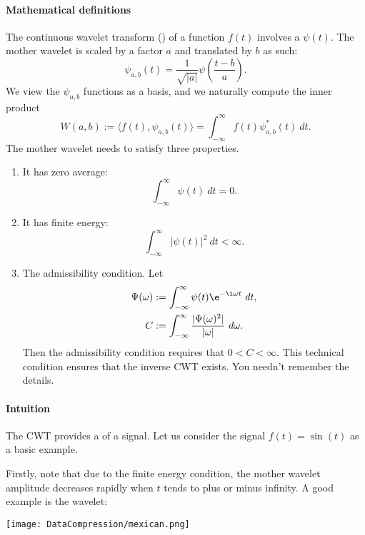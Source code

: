 \documentclass[a4paper, 11pt, openany]{book}
\begin{document}
\paragraph{Mathematical definitions}
The continuous wavelet transform () of a function $f(t)$ involves a  $\psi(t)$. The mother wavelet is scaled by a factor $a$ and translated by $b$ as such:
\[
    \psi_{a,b}(t) = \frac{1}{\sqrt{|a|}} \psi \left( \frac{t-b}{a} \right).
\]
We view the $\psi_{a,b}$ functions as a basis, and we naturally compute the inner product
\[
    W(a,b) := \langle f(t), \psi_{a,b}(t)  \rangle = \int_{-\infty}^\infty f(t) \psi^*_{a,b}(t) \ dt.
\]
The mother wavelet needs to satisfy three properties.
\begin{enumerate}
    \item It has zero average:
    \[
        \int_{-\infty}^\infty \psi(t) \ dt = 0.
    \]

    \item It has finite energy:
    \[
        \int_{-\infty}^\infty |\psi(t)|^2 \ dt < \infty.
    \]

    \item The admissibility condition. Let
    \begin{align*}
        \Psi(\omega) &:= \int_{-\infty}^\infty \psi(t) \e^{-\i \omega t} \ dt,\\
        C &:= \int_{-\infty}^\infty \frac{ |\Psi(\omega)^2| }{ |\omega| } \ d\omega.
    \end{align*}
    Then the admissibility condition requires that $0 < C < \infty$. This technical condition ensures that the inverse CWT exists. You needn't remember the details.
\end{enumerate}

\paragraph{Intuition}
The CWT provides a  of a signal. Let us consider the signal $f(t) = \sin (t)$ as a basic example.

Firstly, note that due to the finite energy condition, the mother wavelet amplitude decreases rapidly when $t$ tends to plus or minus infinity. A good example is the  wavelet:

\begin{center}
\texttt{[image: DataCompression/mexican.png]}
\end{center}
\end{document}
